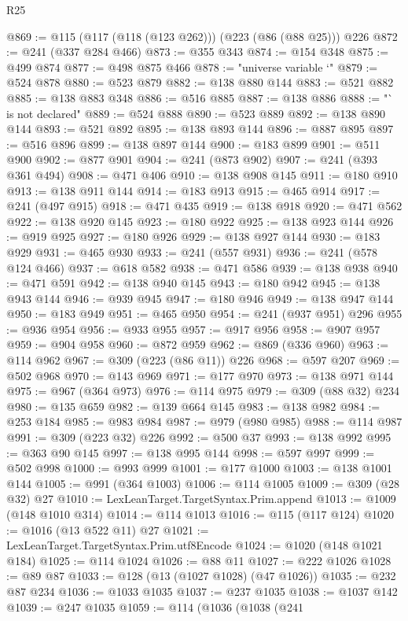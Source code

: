 \begin{lexlean}{R25}
\begin{coremodule}
@869 := @115 (@117 (@118 (@123 @262))) (@223 (@86 (@88 @25))) @226
@872 := @241 (@337 @284 @466)
@873 := @355 @343
@874 := @154 @348
@875 := @499 @874
@877 := @498 @875 @466
@878 := "universe variable `"
@879 := @524 @878
@880 := @523 @879
@882 := @138 @880 @144
@883 := @521 @882
@885 := @138 @883 @348
@886 := @516 @885
@887 := @138 @886
@888 := "` is not declared"
@889 := @524 @888
@890 := @523 @889
@892 := @138 @890 @144
@893 := @521 @892
@895 := @138 @893 @144
@896 := @887 @895
@897 := @516 @896
@899 := @138 @897 @144
@900 := @183 @899
@901 := @511 @900
@902 := @877 @901
@904 := @241 (@873 @902)
@907 := @241 (@393 @361 @494)
@908 := @471 @406
@910 := @138 @908 @145
@911 := @180 @910
@913 := @138 @911 @144
@914 := @183 @913
@915 := @465 @914
@917 := @241 (@497 @915)
@918 := @471 @435
@919 := @138 @918
@920 := @471 @562
@922 := @138 @920 @145
@923 := @180 @922
@925 := @138 @923 @144
@926 := @919 @925
@927 := @180 @926
@929 := @138 @927 @144
@930 := @183 @929
@931 := @465 @930
@933 := @241 (@557 @931)
@936 := @241 (@578 @124 @466)
@937 := @618 @582
@938 := @471 @586
@939 := @138 @938
@940 := @471 @591
@942 := @138 @940 @145
@943 := @180 @942
@945 := @138 @943 @144
@946 := @939 @945
@947 := @180 @946
@949 := @138 @947 @144
@950 := @183 @949
@951 := @465 @950
@954 := @241 (@937 @951) @296
@955 := @936 @954
@956 := @933 @955
@957 := @917 @956
@958 := @907 @957
@959 := @904 @958
@960 := @872 @959
@962 := @869 (@336 @960)
@963 := @114 @962
@967 := @309 (@223 (@86 @11)) @226
@968 := @597 @207
@969 := @502 @968
@970 := @143 @969
@971 := @177 @970
@973 := @138 @971 @144
@975 := @967 (@364 @973)
@976 := @114 @975
@979 := @309 (@88 @32) @234
@980 := @135 @659
@982 := @139 @664 @145
@983 := @138 @982
@984 := @253 @184
@985 := @983 @984
@987 := @979 (@980 @985)
@988 := @114 @987
@991 := @309 (@223 @32) @226
@992 := @500 @37
@993 := @138 @992
@995 := @363 @90 @145
@997 := @138 @995 @144
@998 := @597 @997
@999 := @502 @998
@1000 := @993 @999
@1001 := @177 @1000
@1003 := @138 @1001 @144
@1005 := @991 (@364 @1003)
@1006 := @114 @1005
@1009 := @309 (@28 @32) @27
@1010 := LexLeanTarget.TargetSyntax.Prim.append
@1013 := @1009 (@148 @1010 @314)
@1014 := @114 @1013
@1016 := @115 (@117 @124)
@1020 := @1016 (@13 @522 @11) @27
@1021 := LexLeanTarget.TargetSyntax.Prim.utf8Encode
@1024 := @1020 (@148 @1021 @184)
@1025 := @114 @1024
@1026 := @88 @11
@1027 := @222 @1026
@1028 := @89 @87
@1033 := @128 (@13 (@1027 @1028) (@47 @1026))
@1035 := @232 @87 @234
@1036 := @1033 @1035
@1037 := @237 @1035
@1038 := @1037 @142
@1039 := @247 @1035
@1059 := @114
    (@1036
      (@1038
        (@241

\end{coremodule}
\end{lexlean}
